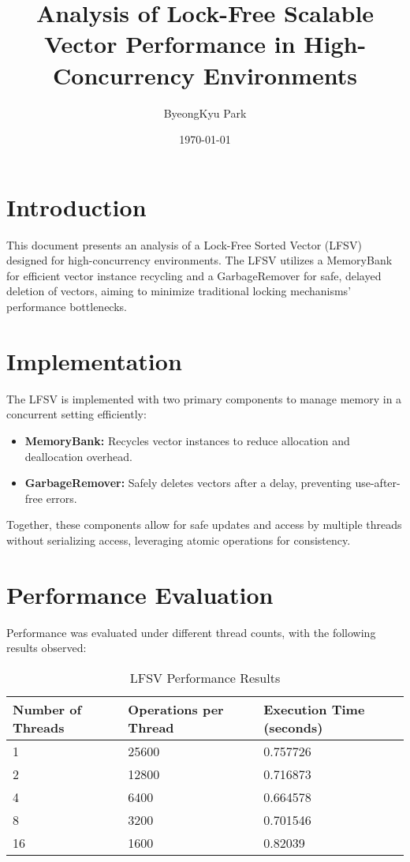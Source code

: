 \documentclass{article}
\title{Analysis of Lock-Free Scalable Vector Performance in High-Concurrency Environments}
\author{ByeongKyu Park}
\date{\today}
\begin{document}
\maketitle

\section{Introduction}
This document presents an analysis of a Lock-Free Sorted Vector (LFSV) designed for high-concurrency environments. The LFSV utilizes a MemoryBank for efficient vector instance recycling and a GarbageRemover for safe, delayed deletion of vectors, aiming to minimize traditional locking mechanisms' performance bottlenecks.

\section{Implementation}
The LFSV is implemented with two primary components to manage memory in a concurrent setting efficiently:
\begin{itemize}
    \item \textbf{MemoryBank:} Recycles vector instances to reduce allocation and deallocation overhead.
    \item \textbf{GarbageRemover:} Safely deletes vectors after a delay, preventing use-after-free errors.
\end{itemize}
Together, these components allow for safe updates and access by multiple threads without serializing access, leveraging atomic operations for consistency.

\section{Performance Evaluation}
Performance was evaluated under different thread counts, with the following results observed:

\begin{table}[h]
\centering
\begin{tabular}{|l|l|l|}
\hline
\textbf{Number of Threads} & \textbf{Operations per Thread} & \textbf{Execution Time (seconds)} \\ \hline
1                          & 25600                          & 0.757726                          \\ \hline
2                          & 12800                          & 0.716873                          \\ \hline
4                          & 6400                           & 0.664578                          \\ \hline
8                          & 3200                           & 0.701546                          \\ \hline
16                         & 1600                           & 0.82039                           \\ \hline
\end{tabular}
\caption{LFSV Performance Results}
\label{table:performance}
\end{table}
\end{document}
